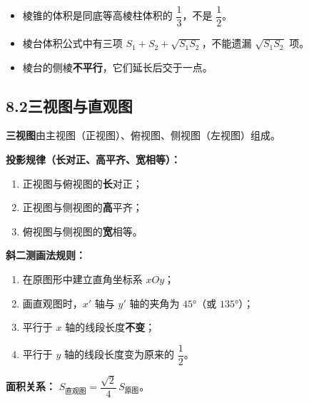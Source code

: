 \documentclass[12pt, a4paper]{ctexart}
\begin{document}
\begin{warnbox}[易错提醒]
\begin{itemize}[leftmargin=2em]
  \item 棱锥的体积是同底等高棱柱体积的 $\dfrac{1}{3}$，不是 $\dfrac{1}{2}$。
  \item 棱台体积公式中有三项 $S_1 + S_2 + \sqrt{S_1 S_2}$，不能遗漏 $\sqrt{S_1 S_2}$ 项。
  \item 棱台的侧棱\textbf{不平行}，它们延长后交于一点。
\end{itemize}
\end{warnbox}

\subsection*{8.2\quad 三视图与直观图}

\begin{knowledgebox}[【知识4】三视图]
\textbf{三视图}由主视图（正视图）、俯视图、侧视图（左视图）组成。

\textbf{投影规律（长对正、高平齐、宽相等）：}
\begin{enumerate}[leftmargin=2em]
  \item 正视图与俯视图的\textbf{长}对正；
  \item 正视图与侧视图的\textbf{高}平齐；
  \item 俯视图与侧视图的\textbf{宽}相等。
\end{enumerate}
\end{knowledgebox}

\begin{center}
\end{center}

\begin{knowledgebox}
\textbf{斜二测画法规则：}
\begin{enumerate}[leftmargin=2em]
  \item 在原图形中建立直角坐标系 $xOy$；
  \item 画直观图时，$x'$ 轴与 $y'$ 轴的夹角为 $45°$（或 $135°$）；
  \item 平行于 $x$ 轴的线段长度\textbf{不变}；
  \item 平行于 $y$ 轴的线段长度变为原来的 $\dfrac{1}{2}$。
\end{enumerate}

\textbf{面积关系：} $S_{\text{直观图}} = \dfrac{\sqrt{2}}{4} \, S_{\text{原图}}$。
\end{knowledgebox}
\end{document}
